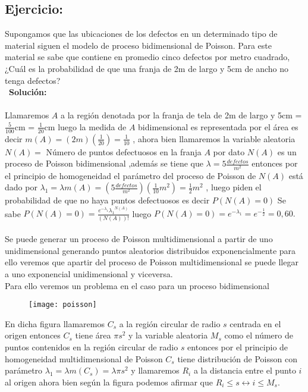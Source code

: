 \documentclass{article}
\begin{document}
\subsection{Ejercicio:}
Supongamos que las ubicaciones de los defectos en un determinado tipo de material siguen el modelo de proceso bidimensional de Poisson. Para este material se sabe que contiene en promedio cinco defectos por metro cuadrado, ¿Cuál es la probabilidad de que  una franja de 2m de largo y 5cm de ancho no tenga defectos?\\\
{\bf Solución:}\\\\
Llamaremos $A$ a la región denotada por la franja de tela de 2m de largo y 5cm = $\frac{5}{100}$cm = $\frac{1}{20}$cm luego la medida de $A$ bidimensional es representada por el área es decir $m(A) = (2m)(\frac{1}{20}) = \frac{1}{10}$ , ahora bien llamaremos la variable aleatoria $N(A) =$ Número de puntos defectuosos en la franja $A$ por dato $N(A)$ es un proceso de Poisson bidimensional ,además se tiene que $\lambda = 5\frac{defectos}{m^2}$ entonces por el principio de homogeneidad el parámetro del proceso de Poisson de $N(A)$ está dado por $\lambda_1 = \lambda m(A) = (5\frac{defectos}{m^2})(\frac{1}{10}m^2) = \frac{1}{2}m^2$ , luego piden el probabilidad de que no haya puntos defectuosos es decir $P(N(A) =0)$ Se sabe $P(N(A)=0) = \frac{e^{-\lambda_1}{\lambda_1}^{N(A)}}{(N(A))!}$ luego $P(N(A)=0) = e^{-\lambda_1} = e^{-\frac{1}{2}} = 0,60.$\\\\
Se puede generar un proceso de Poisson multidimensional a partir de uno unidimensional generando puntos aleatorios distribuidos exponencialmente para ello veremos que apartir del proceso de Poisson multidimensional se puede llegar a uno exponencial unidimensional y viceversa.\\
Para ello veremos un problema en el caso para un proceso bidimensional
\begin{figure}[h!]
\centering
\texttt{[image: poisson]}
\end{figure}
En dicha figura llamaremos $C_s$ a la región circular de radio $s$ centrada en el origen entonces $C_s$ tiene área $\pi s^2$  y la variable aleatoria $M_s$ como el número de puntos contenidos en la región circular de radio $s$ entonces por el principio de homogeneidad multidimensional de Poisson $C_s$ tiene distribución de Poisson con parámetro $\lambda_1 =\lambda m(C_s) = \lambda\pi s^2 $ y llamaremos $R_i$ a la distancia entre el punto $i$ al origen ahora bien según la figura podemos afirmar que $R_i \leq s \leftrightarrow i \leq M_s$.\\
\end{document}
